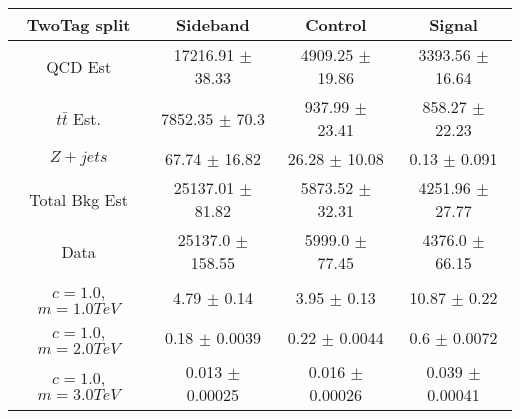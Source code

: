\begin{footnotesize} 
\begin{tabular}{c|c|c|c} 
TwoTag split & Sideband & Control & Signal \\ 
\hline\hline 
QCD Est & 17216.91 $\pm$ 38.33 & 4909.25 $\pm$ 19.86 & 3393.56 $\pm$ 16.64\\ 
$t\bar{t}$ Est.  & 7852.35 $\pm$ 70.3 & 937.99 $\pm$ 23.41 & 858.27 $\pm$ 22.23\\ 
$Z+jets$ & 67.74 $\pm$ 16.82 & 26.28 $\pm$ 10.08 & 0.13 $\pm$ 0.091\\ 
Total Bkg Est & 25137.01 $\pm$ 81.82 & 5873.52 $\pm$ 32.31 & 4251.96 $\pm$ 27.77\\ 
Data & 25137.0 $\pm$ 158.55 & 5999.0 $\pm$ 77.45 & 4376.0 $\pm$ 66.15\\ 
$c=1.0$,$m=1.0TeV$ & 4.79 $\pm$ 0.14 & 3.95 $\pm$ 0.13 & 10.87 $\pm$ 0.22\\ 
$c=1.0$,$m=2.0TeV$ & 0.18 $\pm$ 0.0039 & 0.22 $\pm$ 0.0044 & 0.6 $\pm$ 0.0072\\ 
$c=1.0$,$m=3.0TeV$ & 0.013 $\pm$ 0.00025 & 0.016 $\pm$ 0.00026 & 0.039 $\pm$ 0.00041\\ 
\hline\hline 
\end{tabular} 
\end{footnotesize} 
\newline 
